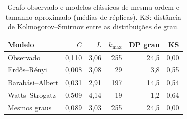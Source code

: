 \begin{table}
  \caption{Grafo observado e modelos clássicos de mesma ordem e tamanho aproximado (médias de réplicas). KS: distância de Kolmogorov--Smirnov entre as distribuições de grau.}
  \label{tab:modelos}
  \small
  \begin{tabular}{lrrrrr}
    \toprule
    Modelo & $C$ & $L$ & $k_{\max}$ & DP grau & KS \\
    \midrule
    Observado & 0,110 & 3,06 & 255 & 24,5 & 0,00 \\
    Erd\H{o}s--R\'enyi & 0,008 & 3,08 & 29 & 3,8 & 0,55 \\
    Barab\'asi--Albert & 0,031 & 2,91 & 197 & 14,5 & 0,54 \\
    Watts--Strogatz & 0,509 & 4,14 & 19 & 1,2 & 0,64 \\
    Mesmos graus & 0,089 & 3,03 & 255 & 24,5 & 0,00 \\
    \bottomrule
  \end{tabular}
\end{table}
